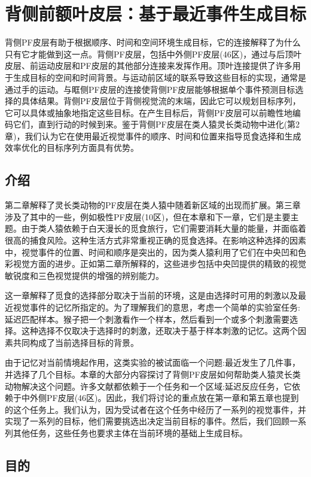 \chapter{背侧前额叶皮层：基于最近事件生成目标}
背侧PF皮层有助于根据顺序、时间和空间环境生成目标，它的连接解释了为什么只有它才能做到这一点。背侧PF皮层，包括中外侧PF皮层(46区)，通过与后顶叶皮层、前运动皮层和PF皮层的其他部分连接来发挥作用。顶叶连接提供了许多用于生成目标的空间和时间背景。与运动前区域的联系导致这些目标的实现，通常是通过手的运动。与眶侧PF皮层的连接使背侧PF皮层能够根据单个事件预测目标选择的具体结果。背侧PF皮层位于背侧视觉流的末端，因此它可以规划目标序列，它可以具体或抽象地指定这些目标。在产生目标后，背侧PF皮层可以前瞻性地编码它们，直到行动的时候到来。鉴于背侧PF皮层在类人猿灵长类动物中进化(第2章)，我们认为它在使用最近视觉事件的顺序、时间和位置来指导觅食选择和生成效率优化的目标序列方面具有优势。

\section{介绍}
第二章解释了灵长类动物的PF皮层在类人猿中随着新区域的出现而扩展。第三章涉及了其中的一些，例如极性PF皮层(10区)，但在本章和下一章，它们是主要主题。由于类人猿依赖于白天漫长的觅食旅行，它们需要消耗大量的能量，并面临着很高的捕食风险。这种生活方式非常重视正确的觅食选择。在影响这种选择的因素中，视觉事件的位置、时间和顺序是突出的，因为类人猿利用了它们在中央凹和色彩视觉方面的进步。正如第二章所解释的，这些进步包括中央凹提供的精致的视觉敏锐度和三色视觉提供的增强的辨别能力。

这一章解释了觅食的选择部分取决于当前的环境，这是由选择时可用的刺激以及最近视觉事件的记忆所指定的。为了理解我们的意思，考虑一个简单的实验室任务:延迟匹配样本。猴子把一个刺激看作一个样本，然后看到一个或多个刺激需要选择。这种选择不仅取决于选择时的刺激，还取决于基于样本刺激的记忆。这两个因素共同构成了当前选择目标的背景。

由于记忆对当前情境起作用，这类实验的被试面临一个问题:最近发生了几件事，并选择了几个目标。本章的大部分内容探讨了背侧PF皮层如何帮助类人猿灵长类动物解决这个问题。许多文献都依赖于一个任务和一个区域:延迟反应任务，它依赖于中外侧PF皮层(46区)。因此，我们将讨论的重点放在第一章和第五章也提到的这个任务上。我们认为，因为受试者在这个任务中经历了一系列的视觉事件，并实现了一系列的目标，他们需要挑选出决定当前目标的事件。然后，我们回顾一系列其他任务，这些任务也要求主体在当前环境的基础上生成目标。
\section{目的}

